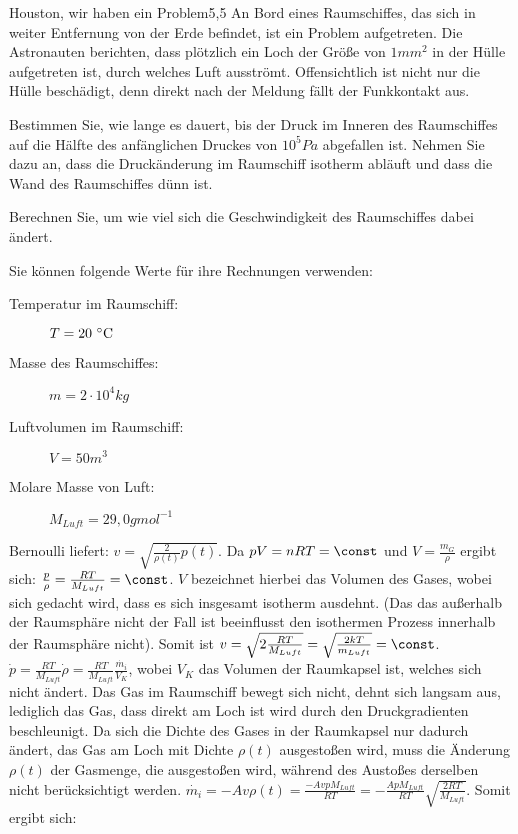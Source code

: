 \begin{problem}{Houston, wir haben ein Problem}{5,5}
An Bord eines Raumschiffes, das sich in weiter Entfernung von der Erde befindet, ist ein Problem aufgetreten.  Die Astronauten berichten, dass plötzlich ein Loch der Größe von $1\unit{mm^2}$ in der Hülle aufgetreten ist, durch welches Luft ausströmt.  Offensichtlich ist nicht nur die Hülle beschädigt, denn direkt nach der Meldung fällt der Funkkontakt aus.
\begin{abcenum}
  \item Bestimmen Sie, wie lange es dauert, bis der Druck im Inneren des Raumschiffes auf die Hälfte des anfänglichen Druckes von $10^5\unit{Pa}$ abgefallen ist.  Nehmen Sie dazu an, dass die Druckänderung im Raumschiff isotherm abläuft und dass die Wand des Raumschiffes dünn ist.
  \item Berechnen Sie, um wie viel sich die Geschwindigkeit des Raumschiffes dabei ändert.
\end{abcenum}
Sie können folgende Werte für ihre Rechnungen verwenden:
\begin{description}
\item[Temperatur im Raumschiff:] $T=20\,\mathrm{\,^\circ\mathrm{C}}$
\item[Masse des Raumschiffes:] $m=2\cdot 10^4\unit{kg}$
\item[Luftvolumen im Raumschiff:] $V=50\unit{m^3}$
\item[Molare Masse von Luft:] $M_{Luft}=29,0\unit{g mol^{-1}}$
\end{description}
\begin{solution}
\begin{abcenum}
\item
  Bernoulli liefert: $v=\sqrt{\frac{2}{\rho(t)}p(t)}$.  Da $pV=nRT=\const$ und $V=\frac{m_G}{\rho}$ ergibt sich: $\frac{p}{\rho}=\frac{RT}{M_{Luft}}=\const$. $V$ bezeichnet hierbei das Volumen des Gases, wobei sich gedacht wird, dass es sich insgesamt isotherm ausdehnt. (Das das außerhalb der Raumsphäre nicht der Fall ist beeinflusst den isothermen Prozess innerhalb der Raumsphäre nicht).  Somit ist $v=\sqrt{2\frac{RT}{M_{Luft}}}=\sqrt{\frac{2kT}{m_{Luft}}}=\const$.  $\dot{p}=\frac{RT}{M_{Luft}}\dot{\rho}=\frac{RT}{M_{Luft}}\frac{\dot{m_i}}{V_K}$, wobei $V_K$ das Volumen der Raumkapsel ist, welches sich nicht ändert.  Das Gas im Raumschiff bewegt sich nicht, dehnt sich langsam aus, lediglich das Gas, dass direkt am Loch ist wird durch den Druckgradienten beschleunigt.  Da sich die Dichte des Gases in der Raumkapsel nur dadurch ändert, das Gas am Loch mit Dichte $\rho(t)$ ausgestoßen wird, muss die Änderung $\rho(t)$ der Gasmenge, die ausgestoßen wird, während des Austoßes derselben nicht berücksichtigt werden.  $\dot{m_i}=-Av\rho(t)=\frac{-AvpM_{Luft}}{RT}=-\frac{ApM_{Luft}}{RT}\sqrt{\frac {2RT}{M_{Luft}}}$.  Somit ergibt sich:


\end{abcenum}
\end{solution}
\end{problem}
